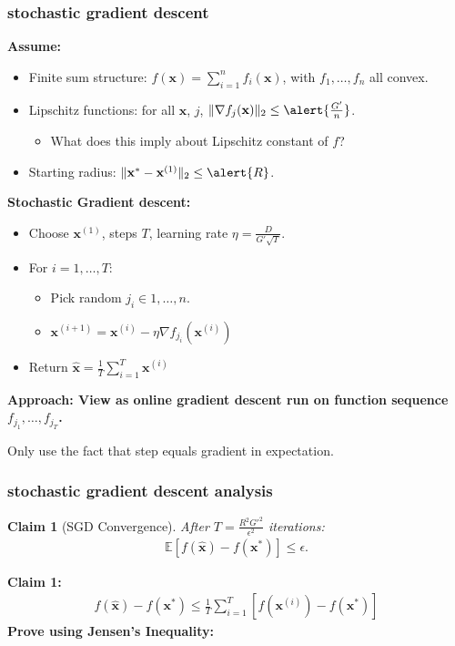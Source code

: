 \documentclass[compress]{beamer}
\newcommand{\bv}[1]{\mathbf{#1}}
\newcommand{\E}{\mathbb{E}}
\newtheorem{claim}[theorem]{Claim}
\begin{document}
\begin{frame}[t]
	\frametitle{stochastic gradient descent}
	\small
		\vspace{-.5em}
	\textbf{Assume:}
	\vspace{-1em}
	\begin{itemize}
		\item {Finite sum structure:} $f(\bv{x}) = \sum_{i=1}^n f_i(\bv{x})$, with $f_1, \ldots, f_n$ all convex.
		\item {Lipschitz functions}: for all $\bv{x}$, $j$, $\|\nabla f_j(\bv{x})\|_2 \leq \alert{\frac{G'}{n}}$.
		\begin{itemize}
			\item What does this imply about Lipschitz constant of $f$?
		\end{itemize}
		\item Starting radius: $\|\bv{x}^{*} - \bv{x}^{(1)}\|_2 \leq \alert{R}$.
	\end{itemize}
	
	\vspace{-.5em}
	\textbf{Stochastic Gradient descent:}
	\vspace{-1em}
	\begin{itemize}
		\item Choose $\bv{x}^{(1)}$, steps $T$, learning rate $\eta = \frac{D}{G'\sqrt{T}}$.
		\item For $i = 1,\ldots, T$:
		\begin{itemize}
			\item Pick random $j_i \in 1, \ldots, n$.
			\item $\bv{x}^{(i+1)} = \bv{x}^{(i)} - \eta \nabla f_{j_i}(\bv{x}^{(i)})$
		\end{itemize}
		\item Return $\hat{\bv{x}} = \frac{1}{T}\sum_{i=1}^T \bv{x}^{(i)}$
	\end{itemize}
\alert{	\textbf{Approach: View as online gradient descent run on function sequence $f_{j_1}, \ldots, f_{j_T}$.} } 

Only use the fact that step equals gradient in expectation.
\end{frame}


\begin{frame}[t]
	\frametitle{stochastic gradient descent analysis}
	\begin{claim}[SGD Convergence]
		After $T = \frac{R^2G'^2}{\epsilon^2}$ iterations:
		\begin{align*}
			\E\left[f(\hat{\bv{x}}) - f(\bv{x}^*)\right] \leq \epsilon.
		\end{align*}

	\end{claim}
	\textbf{Claim 1:} 
	\begin{align*}
		f(\hat{\bv{x}}) - f(\bv{x}^*) \leq \frac{1}{T}\sum_{i=1}^T\left[f(\bv{x}^{(i)}) -f(\bv{x}^*)\right]
	\end{align*}
\textbf{Prove using Jensen's Inequality:}
\end{frame}
\end{document}
